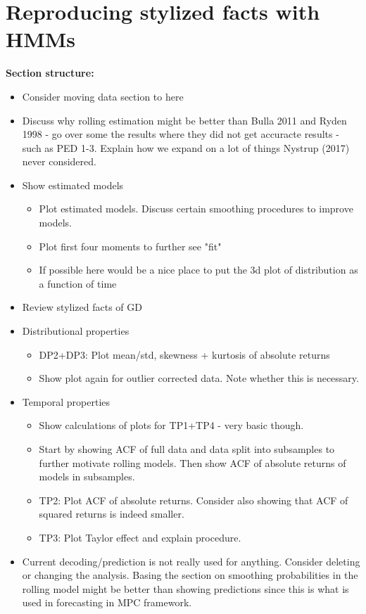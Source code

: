 \newpage

\section{Reproducing stylized facts with HMMs}
\label{Section: Stylized facts}


\textbf{Section structure:}
\begin{itemize}
    \item Consider moving data section to here
    \item Discuss why rolling estimation might be better than Bulla 2011 and Ryden 1998 - go over some the results where they did not get accuracte results - such as PED 1-3. Explain how we expand on a lot of things Nystrup (2017) never considered.
    \item Show estimated models
    \begin{itemize}
        \item Plot estimated models. Discuss certain smoothing procedures to improve models.
        \item Plot first four moments to further see "fit"
        \item If possible here would be a nice place to put the 3d plot of distribution as a function of time
    \end{itemize} 
    \item Review stylized facts of GD
    \item Distributional properties
    \begin{itemize}
        \item DP2+DP3: Plot mean/std, skewness + kurtosis of absolute returns
        \item Show plot again for outlier corrected data. Note whether this is necessary.
    \end{itemize}
    \item Temporal properties
    \begin{itemize}
        \item Show calculations of plots for TP1+TP4 - very basic though.
        \item Start by showing ACF of full data and data split into subsamples to further motivate rolling models. Then show ACF of absolute returns of models in subsamples.
        \item TP2: Plot ACF of absolute returns. Consider also showing that ACF of squared returns is indeed smaller.
        \item TP3: Plot Taylor effect and explain procedure.
        
    \end{itemize}
    \item Current decoding/prediction is not really used for anything. Consider deleting or changing the analysis. Basing the section on smoothing probabilities in the rolling model might be better than showing predictions since this is what is used in forecasting in MPC framework.
\end{itemize}

